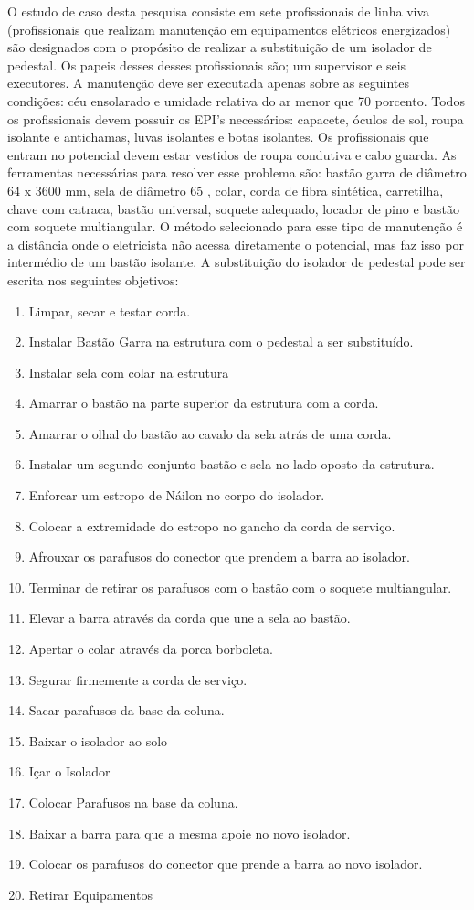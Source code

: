 O estudo de caso desta pesquisa consiste em sete profissionais de linha viva (profissionais que realizam manutenção em equipamentos elétricos energizados) são designados com o propósito de realizar a substituição de um isolador de pedestal. Os papeis desses desses profissionais são; um supervisor e seis executores. A manutenção deve ser executada apenas sobre as seguintes condições: céu ensolarado e umidade relativa do ar menor que 70 porcento. Todos os profissionais devem possuir os EPI's necessários: capacete, óculos de sol, roupa isolante e antichamas, luvas isolantes e botas isolantes. Os profissionais que entram no potencial devem estar vestidos de roupa condutiva e cabo guarda. As ferramentas necessárias para resolver esse problema são: bastão garra de diâmetro 64 x 3600 mm, sela de diâmetro 65 , 
colar, corda de fibra sintética, carretilha, chave com catraca, bastão universal, soquete adequado, locador de pino e bastão com soquete multiangular. O método selecionado para esse tipo de manutenção é a distância onde o eletricista não acessa diretamente o potencial, mas faz isso por intermédio de um bastão isolante. A substituição do isolador 
de pedestal pode ser escrita nos seguintes objetivos: 

\begin{enumerate}
	\item Limpar, secar e testar corda.
	\item Instalar Bastão Garra na estrutura com o pedestal a ser substituído.
	\item Instalar sela com colar na estrutura
	\item Amarrar o bastão na parte superior da estrutura com a corda.
	\item Amarrar o olhal do bastão ao cavalo da sela atrás de uma corda.
	\item Instalar um segundo conjunto bastão e sela no lado oposto da estrutura.
	\item Enforcar um estropo de Náilon no corpo do isolador.
	\item Colocar a extremidade do estropo no gancho da corda de serviço.
	\item Afrouxar os parafusos do conector que prendem a barra ao isolador.
	\item Terminar de retirar os parafusos com o bastão com o soquete multiangular.
	\item Elevar a barra através da corda que une a sela ao bastão.
	\item Apertar o colar através da porca borboleta.
	\item Segurar firmemente a corda de serviço.
	\item Sacar parafusos da base da coluna.
	\item Baixar o isolador ao solo
	\item Içar o Isolador
	\item Colocar Parafusos na base da coluna.
	\item Baixar a barra para que a mesma apoie no novo isolador.
	\item Colocar os parafusos do conector que prende a barra ao novo isolador. 
	\item Retirar Equipamentos
\end{enumerate}

